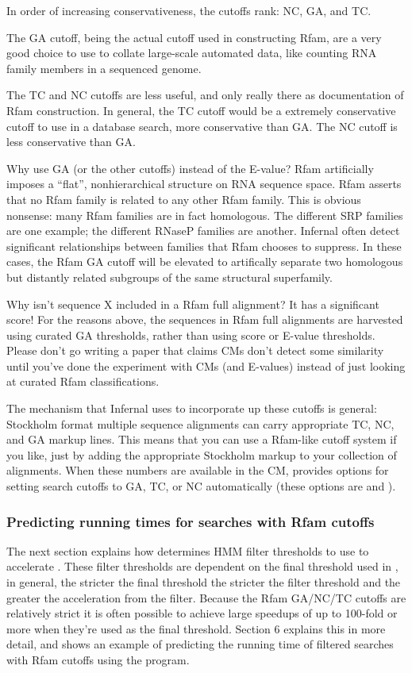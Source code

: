 In order of increasing conservativeness, the cutoffs rank: NC, GA, and
TC.

The GA cutoff, being the actual cutoff used in constructing Rfam,
are a very good choice to use to collate large-scale automated data,
like counting RNA family members in a sequenced genome.

The TC and NC cutoffs are less useful, and only really there as
documentation of Rfam construction. In general, the TC cutoff would
be a extremely conservative cutoff to use in a database search, more
conservative than GA. The NC cutoff is less conservative than GA.

Why use GA (or the other cutoffs) instead of the E-value? Rfam
artificially imposes a ``flat'', nonhierarchical structure on RNA
sequence space.  Rfam asserts that no Rfam family is related to any
other Rfam family. This is obvious nonsense: many Rfam families are in
fact homologous.  The different SRP families are one example; the
different RNaseP families are another. Infernal often
detect significant relationships between families that Rfam chooses to
suppress. In these cases, the Rfam GA cutoff will be elevated to
artifically separate two homologous but distantly related subgroups of
the same structural superfamily.

\begin{srefaq}{Why isn't sequence X included in a Rfam full alignment?
It has a significant score!} For the reasons above, the sequences in
Rfam full alignments are harvested using curated GA thresholds, rather
than using score or E-value thresholds. Please don't go writing a
paper that claims CMs don't detect some similarity until you've done
the experiment with CMs (and E-values) instead of just looking at
curated Rfam classifications.
\end{srefaq}

The mechanism that Infernal uses to incorporate up these cutoffs is
general: Stockholm format multiple sequence alignments can carry
appropriate TC, NC, and GA markup lines. This means that you can use a
Rfam-like cutoff system if you like, just by adding the appropriate
Stockholm markup to your collection of alignments. When these numbers
are available in the CM,  provides options
for setting search cutoffs to GA, TC, or NC automatically (these options
are  and ).

\subsubsection{Predicting running times for searches with Rfam cutoffs}
The next section explains how  determines HMM filter
thresholds to use to accelerate . These filter
thresholds are dependent on the final threshold used in
, in general, the stricter the final threshold the
stricter the filter threshold and the greater the acceleration from
the filter. Because the Rfam GA/NC/TC cutoffs are relatively strict it
is often possible to achieve large speedups of up to 100-fold or more
when they're used as the final threshold. Section 6 explains this in
more detail, and shows an example of predicting the running time of
filtered searches with Rfam cutoffs using the  program.

